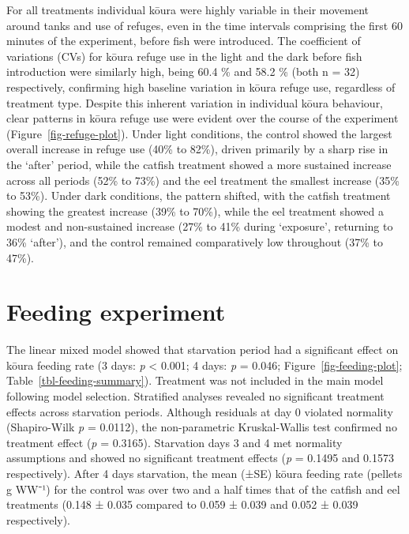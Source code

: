 \documentclass[
  12pt,
  a4paper,
]{scrbook}
\begin{document}
For all treatments individual kōura were highly variable in their
movement around tanks and use of refuges, even in the time intervals
comprising the first 60 minutes of the experiment, before fish were
introduced. The coefficient of variations (CVs) for kōura refuge use in
the light and the dark before fish introduction were similarly high,
being 60.4 \% and 58.2 \% (both n = 32) respectively, confirming high
baseline variation in kōura refuge use, regardless of treatment type.
Despite this inherent variation in individual kōura behaviour, clear
patterns in kōura refuge use were evident over the course of the
experiment (Figure~\ref{fig-refuge-plot}). Under light conditions, the
control showed the largest overall increase in refuge use (40\% to
82\%), driven primarily by a sharp rise in the `after' period, while the
catfish treatment showed a more sustained increase across all periods
(52\% to 73\%) and the eel treatment the smallest increase (35\% to
53\%). Under dark conditions, the pattern shifted, with the catfish
treatment showing the greatest increase (39\% to 70\%), while the eel
treatment showed a modest and non-sustained increase (27\% to 41\%
during `exposure', returning to 36\% `after'), and the control remained
comparatively low throughout (37\% to 47\%).

\section{Feeding experiment}\label{feeding-experiment-1}

The linear mixed model showed that starvation period had a significant
effect on kōura feeding rate (3 days: \emph{p} \textless{} 0.001; 4
days: \emph{p} = 0.046; Figure~\ref{fig-feeding-plot};
Table~\ref{tbl-feeding-summary}). Treatment was not included in the main
model following model selection. Stratified analyses revealed no
significant treatment effects across starvation periods. Although
residuals at day 0 violated normality (Shapiro-Wilk \emph{p} = 0.0112),
the non-parametric Kruskal-Wallis test confirmed no treatment effect
(\emph{p} = 0.3165). Starvation days 3 and 4 met normality assumptions
and showed no significant treatment effects (\emph{p} = 0.1495 and
0.1573 respectively). After 4 days starvation, the mean (±SE) kōura
feeding rate (pellets g WW⁻¹) for the control was over two and a half
times that of the catfish and eel treatments (0.148 ± 0.035 compared to
0.059 ± 0.039 and 0.052 ± 0.039 respectively).

\end{document}
